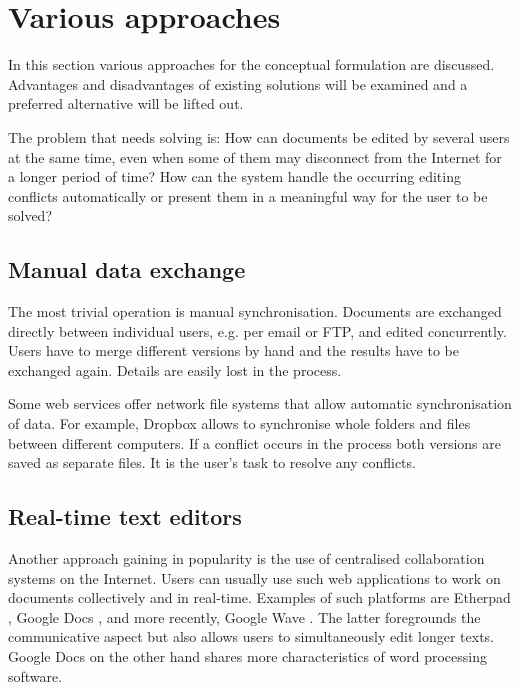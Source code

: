 \section{Various approaches}

In this section various approaches for the conceptual formulation are discussed. Advantages and disadvantages of existing solutions will be examined and a preferred alternative will be lifted out.

The problem that needs solving is: How can documents be edited by several users at the same time, even when some of them may disconnect from the Internet for a longer period of time? How can the system handle the occurring editing conflicts automatically or present them in a meaningful way for the user to be solved?

\subsection{Manual data exchange}

The most trivial operation is manual synchronisation. Documents are exchanged directly between individual users, e.g. per email or FTP, and edited concurrently. Users have to merge different versions by hand and the results have to be exchanged again. Details are easily lost in the process.

Some web services offer network file systems that allow automatic synchronisation of data. For example, Dropbox \cite{dropbox:website} allows to synchronise whole folders and files between different computers. If a conflict occurs in the process both versions are saved as separate files. It is the user's task to resolve any conflicts.

\subsection{Real-time text editors}
\label{subsec:workflow}

Another approach gaining in popularity is the use of centralised collaboration systems on the Internet. Users can usually use such web applications to work on documents collectively and in real-time. Examples of such platforms are Etherpad \cite{etherpad}, Google Docs \cite{google:docs}, and more recently, Google Wave \cite{google:wave}. The latter foregrounds the communicative aspect but also allows users to simultaneously edit longer texts. Google Docs on the other hand shares more characteristics of word processing software.

